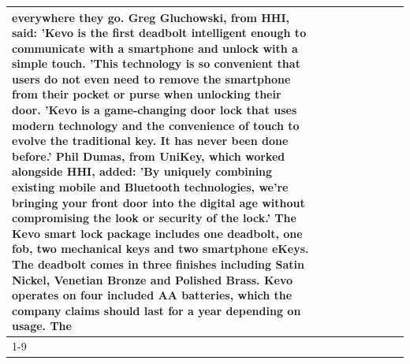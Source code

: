 \begin{table}[H]
\begin{tabular}{lllrlllll}
everywhere they go. Greg Gluchowski, from HHI, said: 'Kevo is the first deadbolt intelligent enough to communicate with a smartphone and unlock with a simple touch. 'This technology is so convenient that users do not even need to remove the smartphone from their pocket or purse when unlocking their door. 'Kevo is a game-changing door lock that uses modern technology and the convenience of touch to evolve the traditional key. It has never been done before.' Phil Dumas, from UniKey, which worked alongside HHI, added: 'By uniquely combining existing mobile and Bluetooth technologies, we’re bringing your front door into the digital age without compromising the look or security of the lock.' The Kevo smart lock package includes one deadbolt, one fob, two mechanical keys and two smartphone eKeys. The deadbolt comes in three finishes including Satin Nickel, Venetian Bronze and Polished Brass. Kevo operates on four included AA batteries, which the company claims should last for a year depending on usage. The \\
\cline{1-9}

\end{tabular}
\end{table}
